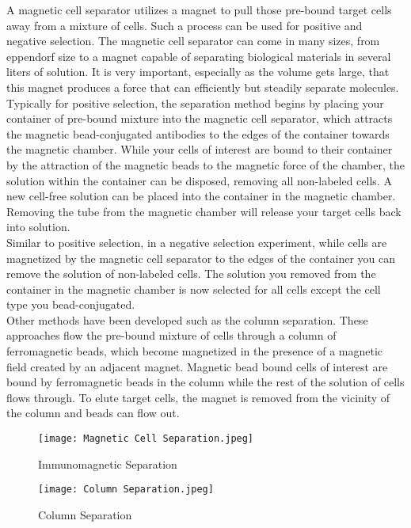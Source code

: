 \documentclass[12pt]{article}
\begin{document}
A magnetic cell separator utilizes a magnet to pull those pre-bound target cells away from a mixture of cells. Such a process can be used for positive and negative selection. The magnetic cell separator can come in many sizes, from eppendorf size to a magnet capable of separating biological materials in several liters of solution. It is very important, especially as the volume gets large, that this magnet produces a force that can efficiently but steadily separate molecules.\\

Typically for positive selection, the separation method begins by placing your container of pre-bound mixture into the magnetic cell separator, which attracts the magnetic bead-conjugated antibodies to the edges of the container towards the magnetic chamber. While your cells of interest are bound to their container by the attraction of the magnetic beads to the magnetic force of the chamber, the solution within the container can be disposed, removing all non-labeled cells. A new cell-free solution can be placed into the container in the magnetic chamber. Removing the tube from the magnetic chamber will release your target cells back into solution.\\

Similar to positive selection, in a negative selection experiment, while cells are magnetized by the magnetic cell separator to the edges of the container you can remove the solution of non-labeled cells. The solution you removed from the container in the magnetic chamber is now selected for all cells except the cell type you bead-conjugated.\\


Other methods have been developed such as the column separation. These approaches flow the pre-bound mixture of cells through a column of ferromagnetic beads, which become magnetized in the presence of a magnetic field created by an adjacent magnet. Magnetic bead bound cells of interest are bound by ferromagnetic beads in the column while the rest of the solution of cells flows through. To elute target cells, the magnet is removed from the vicinity of the column and beads can flow out.\\

\begin{figure}[h]
\centering
\texttt{[image: Magnetic Cell Separation.jpeg]}
\caption{Immunomagnetic Separation}
\end{figure}

\begin{figure}[h]
\centering
\texttt{[image: Column Separation.jpeg]}
\caption{Column Separation}
\end{figure}
\end{document}
